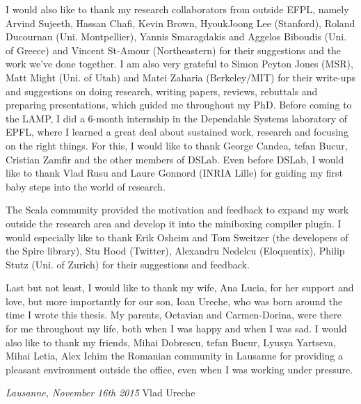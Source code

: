 I would also like to thank my research collaborators from outside EFPL, namely Arvind Sujeeth, Hassan Chafi, Kevin Brown, HyoukJoong Lee (Stanford), Roland Ducournau (Uni. Montpellier), Yannis Smaragdakis and Aggelos Biboudis (Uni. of Greece) and Vincent St-Amour (Northeastern) for their suggestions and the work we've done together. I am also very grateful to Simon Peyton Jones (MSR), Matt Might (Uni. of Utah) and Matei Zaharia (Berkeley/MIT) for their write-ups and suggestions on doing research, writing papers, reviews, rebuttals and preparing presentations, which guided me throughout my PhD. Before coming to the LAMP, I did a 6-month internship in the Dependable Systems laboratory of EPFL, where I learned a great deal about sustained work, research and focusing on the right things. For this, I would like to thank George Candea, tefan Bucur, Cristian Zamfir and the other members of DSLab. Even before DSLab, I would like to thank Vlad Rusu and Laure Gonnord (INRIA Lille) for guiding my first baby steps into the world of research.

\vspace{0.5em}

The Scala community provided the motivation and feedback to expand my work outside the research area and develop it into the miniboxing compiler plugin. I would especially like to thank Erik Osheim and Tom Sweitzer (the developers of the Spire library), Stu Hood (Twitter), Alexandru Nedelcu (Eloquentix), Philip Stutz (Uni. of Zurich) for their suggestions and feedback.

\vspace{0.5em}

Last but not least, I would like to thank my wife, Ana Lucia, for her support and love, but more importantly for our son, Ioan Ureche, who was born around the time I wrote this thesis. My parents, Octavian and Carmen-Dorina, were there for me throughout my life, both when I was happy and when I was sad. I would also like to thank my friends, Mihai Dobrescu, tefan Bucur, Lyusya Yartseva, Mihai Letia, Alex Ichim the Romanian community in Lausanne for providing a pleasant environment outside the office, even when I was working under pressure.

\bigskip

\noindent\textit{Lausanne, November 16th 2015}
\hfill Vlad Ureche
